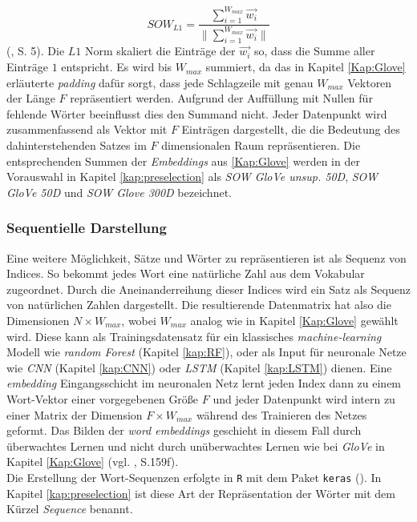 \documentclass[a4paper,11pt]{article}
\begin{document}
\[SOW_{L1} = \frac{\sum_{i=1}^{W_{max}} \Vec{w_i}}{\| \sum_{i=1}^{W_{max}}  \vec{w_i} \|} \]
(\cite{sumsWords}, S. 5). Die $L1$ Norm skaliert die Einträge der $\Vec{w_i}$ so, dass die Summe aller Einträge $1$ entspricht. Es wird bis $W_{max}$ summiert, da das in Kapitel \ref{Kap:Glove} erläuterte \textit{padding} dafür sorgt, dass jede Schlagzeile mit genau $W_{max}$ Vektoren der Länge $F$ repräsentiert werden. Aufgrund der Auffüllung mit Nullen für fehlende Wörter beeinflusst dies den Summand nicht.
Jeder Datenpunkt wird zusammenfassend als Vektor mit $F$ Einträgen dargestellt, die die Bedeutung des dahinterstehenden Satzes im $F$ dimensionalen Raum repräsentieren. Die entsprechenden Summen der \textit{Embeddings} aus \ref{Kap:Glove} werden in der Vorauswahl in Kapitel \ref{kap:preselection} als \textit{SOW GloVe unsup. 50D}, \textit{SOW GloVe 50D} und \textit{SOW Glove 300D} bezeichnet.


\subsubsection{Sequentielle Darstellung} \label{Kap:Seq}

Eine weitere Möglichkeit, Sätze und Wörter zu repräsentieren ist als Sequenz von Indices. So bekommt jedes Wort eine natürliche Zahl aus dem Vokabular zugeordnet. Durch die Aneinanderreihung dieser Indices wird ein Satz als Sequenz von natürlichen Zahlen dargestellt. Die resultierende Datenmatrix hat also die Dimensionen $N \times W_{max}$, wobei $W_{max}$ analog wie in Kapitel \ref{Kap:Glove} gewählt wird. Diese kann als Trainingsdatensatz für ein klassisches \textit{machine-learning} Modell wie \textit{random Forest} (Kapitel \ref{kap:RF}), oder als Input für neuronale Netze wie \textit{CNN} (Kapitel \ref{kap:CNN}) oder \textit{LSTM} (Kapitel \ref{kap:LSTM}) dienen. Eine \textit{embedding} Eingangsschicht im neuronalen Netz lernt jeden Index dann zu einem Wort-Vektor einer vorgegebenen Größe $F$ und jeder Datenpunkt wird intern zu einer Matrix der Dimension $F \times W_{max}$ während des Trainieren des Netzes geformt. Das Bilden der \textit{word embeddings} geschieht in diesem Fall durch überwachtes Lernen und nicht durch unüberwachtes Lernen wie bei \textit{GloVe} in Kapitel \ref{Kap:Glove} (vgl. \cite{keras}, S.159f).\\
Die Erstellung der Wort-Sequenzen erfolgte in \texttt{R} mit dem Paket \texttt{keras} (\cite{kerasR}). In Kapitel \ref{kap:preselection} ist diese Art der Repräsentation der Wörter mit dem Kürzel \textit{Sequence} benannt. \\
\end{document}
